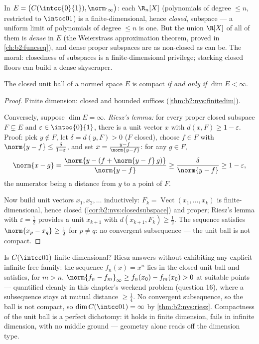 \begin{example}\label{ex:b2:nvs:closeddense}
In $E = \bigl(C(\intcc{0}{1}), \norm\cdot_\infty\bigr)$: each
$\R_n[X]$ (polynomials of degree $\leq n$, restricted to
$\intcc01$) is a finite-dimensional, hence \emph{closed}, subspace
--- a uniform limit of polynomials of degree $\leq n$ is one. But
the union $\R[X]$ of all of them is \emph{dense} in $E$ (the
Weierstrass approximation theorem, proved in
\cref{ch:b2:funcseq}), and dense proper subspaces are as
non-closed as can be. The moral: closedness of subspaces is a
finite-dimensional privilege; stacking closed floors can build a
dense skyscraper.
\end{example}

\begin{theorem}[Riesz]\label{thm:b2:nvs:riesz}
The closed unit ball of a normed space $E$ is compact \emph{if and
only if} $\dim E < \infty$.
\end{theorem}

\begin{proof}
Finite dimension: closed and bounded suffices
(\cref{thm:b2:nvs:finitedim}).

Conversely, suppose $\dim E = \infty$. \emph{Riesz's lemma:} for
every proper closed subspace $F \subsetneq E$ and $\varepsilon \in
\intoo{0}{1}$, there is a unit vector $x$ with $d(x, F) \geq 1 -
\varepsilon$. Proof: pick $y \notin F$, let $\delta = d(y, F) > 0$
($F$ closed), choose $f \in F$ with $\norm{y - f} \leq
\frac{\delta}{1 - \varepsilon}$, and set $x = \frac{y - f}{\norm{y -
f}}$: for any $g \in F$,
\[
\norm{x - g} = \frac{\norm{y - (f + \norm{y-f}\,g)}}{\norm{y - f}}
\geq \frac{\delta}{\norm{y-f}} \geq 1 - \varepsilon ,
\]
the numerator being a distance from $y$ to a point of $F$.

Now build unit vectors $x_1, x_2, \dots$ inductively: $F_k =
\operatorname{Vect}(x_1, \dots, x_k)$ is finite-dimensional, hence
closed (\cref{cor:b2:nvs:closedsubspace}) and proper; Riesz's lemma
with $\varepsilon = \frac12$ provides a unit $x_{k+1}$ with $d(x_{k+1},
F_k) \geq \frac12$. The sequence satisfies $\norm{x_p - x_q} \geq
\frac12$ for $p \neq q$: no convergent subsequence --- the unit ball
is not compact.
\end{proof}

\begin{example}\label{ex:b2:nvs:rieszdetector}
Is $C(\intcc01)$ finite-dimensional? Riesz answers without
exhibiting any explicit infinite free family: the sequence
$f_n(x) = x^n$ lies in the closed unit ball and satisfies, for
$m > n$, $\norm{f_n - f_m}_\infty \geq f_n(x_0) - f_m(x_0) > 0$
at suitable points --- quantified cleanly in this chapter's
weekend problem (question 16), where a subsequence stays at
mutual distance $\geq \frac14$. No convergent subsequence, so
the ball is not compact, so $\dim C(\intcc01) = \infty$ by
\cref{thm:b2:nvs:riesz}. Compactness of the unit ball is a
perfect dichotomy: it holds in finite dimension, fails in
infinite dimension, with no middle ground --- geometry alone
reads off the dimension type.
\end{example}

